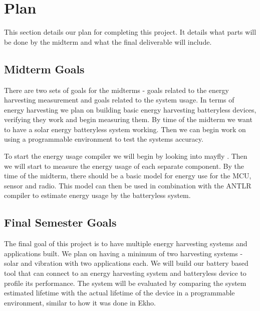 \section{Plan} %
\label{sec:plan}

This section details our plan for completing this project. It details what parts will be done by the midterm and what the final deliverable will include.

\subsection{Midterm Goals}

There are two sets of goals for the midterms - goals related to the energy harvesting measurement and goals related to the system usage.
In terms of energy harvesting we plan on building basic energy harvesting batteryless devices, verifying they work and begin measuring them.
By time of the midterm we want to have a solar energy batteryless system working.
Then we can begin work on using a programmable environment to test the systems accuracy.

To start the energy usage compiler we will begin by looking into mayfly \cite{mayfly}.
Then we will start to measure the energy usage of each separate component.
By the time of the midterm, there should be a basic model for energy use for the MCU, sensor and radio.
This model can then be used in combination with the ANTLR compiler to estimate energy usage by the batteryless system.

\subsection{Final Semester Goals}
The final goal of this project is to have multiple energy harvesting systems and applications built.
We plan on having a minimum of two harvesting systems - solar and vibration with two applications each.
We will build our battery based tool that can connect to an energy harvesting system and batteryless device to profile its performance.
The system will be evaluated by comparing the system estimated lifetime with the actual lifetime of the device in a programmable environment, similar to how it was done in Ekho.
